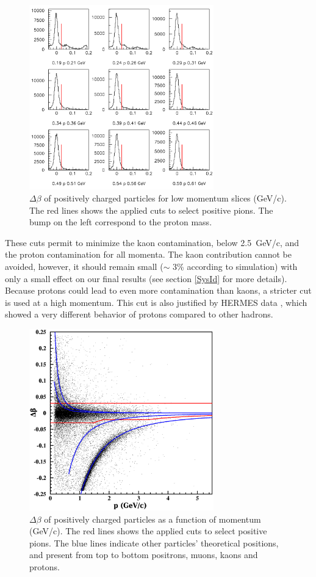 \begin{figure}[tbp]
\centering
\includegraphics[width=8cm] {answer-fig/TofProfile1.png} 
\caption {$\Delta \beta$ of positively charged particles for low momentum slices 
(GeV/c). The red lines shows the applied cuts to select positive pions. The bump on the left
correspond to the proton mass.}
\label{TOF-3}
\end{figure}

These cuts permit to minimize the kaon contamination, below 2.5~GeV/c, and the 
proton contamination for all momenta. The kaon contribution cannot be avoided, however, it should remain small ($\sim$ 3\% according to simulation) 
with only a small effect on our final results (see section \ref{SysId} 
for more details). Because protons could lead to even more contamination than kaons, 
a stricter cut is used at a high momentum. This cut is also justified by 
HERMES data \cite{Airapetian:2007vu}, which showed a very different behavior of protons compared to other hadrons.

\begin{figure}[tbp]
\centering
\includegraphics[width=8cm] {chap5-fig/pip_data.png} 
\caption {$\Delta \beta$ of positively charged particles as a function of momentum (GeV/c). The red lines shows the applied cuts to select positive pions. The blue lines indicate other particles' theoretical positions, and present from top to 
bottom positrons, muons, kaons and protons.}
\label{PipTOF}
\end{figure}

